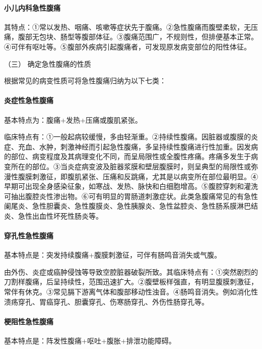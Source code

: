 \paragraph{小儿内科急性腹痛}

其特点：①常以发热、咽痛、咳嗽等症状先于腹痛。②急性腹痛而腹壁柔软，无压痛，腹部无包块、肠型等腹部体征。③腹痛范围广，不规则性，但排便基本正常。④可伴有呕吐等。⑤腹部外疾病引起腹痛者，可发现原发病变部位的阳性体征。

\hypertarget{text00026.htmlux5cux23CHP1-10-2-3-3}{}
（三） 确定急性腹痛的性质

根据常见的病变性质可将急性腹痛归纳为以下七类：

\paragraph{炎症性急性腹痛}

基本特点为：腹痛+发热+压痛或腹肌紧张。

临床特点有：①一般起病较缓慢，多由轻渐重。②持续性腹痛。因脏器或腹膜的炎症、充血、水肿，刺激神经而引起急性腹痛，多呈持续性腹痛进行性加重。因发病的部位、病变程度及其病理变化不同，而呈局限性或全腹性疼痛。疼痛多发生于病变所在的部位。③当炎症病变波及脏器浆膜和壁层腹膜时，则呈典型的局限性或弥漫性腹膜刺激征，即腹肌紧张、压痛和反跳痛，尤其是以病变所在部位最明显。④早期可出现全身感染征象，如寒战、发热、脉快和白细胞增高。⑤腹腔穿刺和灌洗可抽出腹腔炎性渗出物。⑥可有明显的胃肠道刺激症状。此类急腹痛常见的有急性阑尾炎、急性胆囊炎、急性腹膜炎、急性胰腺炎、急性盆腔炎、急性肠系膜淋巴结炎、急性出血性坏死性肠炎等。

\paragraph{穿孔性急性腹痛}

基本特点是：突发持续腹痛+腹膜刺激征，可伴有肠鸣音消失或气腹。

由外伤、炎症或癌肿侵蚀等导致空腔脏器破裂所致。其临床特点有：①突然剧烈的刀割样腹痛，后呈持续性，范围迅速扩大。②腹壁板样强直，有明显腹膜刺激征，常伴有休克。③常见膈下游离气体和腹部移动性浊音。④肠鸣音消失。例如消化性溃疡穿孔、胃癌穿孔、胆囊穿孔、伤寒肠穿孔、外伤性肠穿孔等。

\paragraph{梗阻性急性腹痛}

基本特点是：阵发性腹痛+呕吐+腹胀+排泄功能障碍。

